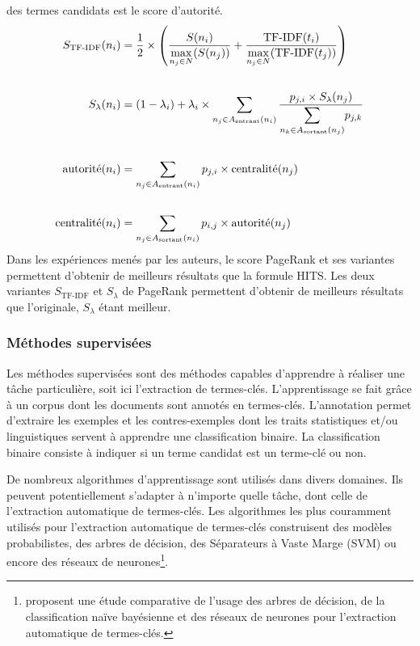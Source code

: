           des termes candidats est le score d'autorité.
          \begin{align}
            S_{\text{TF-IDF}}(n_i) &= \frac{1}{2} \times \left(\frac{S(n_i)}{\mathlarger{\max}_{n_j \in N}(S(n_j))} + \frac{\text{TF-IDF}(t_i)}{\mathlarger{\max}_{n_j \in N}(\text{TF-IDF}(t_j))}\right) \label{math:apw}\\
            \notag\\
            S_{\lambda}(n_i) &= (1 - \lambda_i) + \lambda_i \times \sum_{n_j \in A_{\text{entrant}}(n_i)} \frac{p_{j, i} \times S_{\lambda}(n_j)}{\mathlarger{\sum}_{n_k \in A_{\text{sortant}}(n_j)} p_{j, k}} \label{math:ppr}\\
            \notag\\
            \text{autorité}(n_i) &= \sum_{n_j \in A_{\text{entrant}}(n_i)}p_{j, i} \times \text{centralité}(n_j) \label{math:hitsauthority}\\
            \notag\\
            \text{centralité}(n_i) &= \sum_{n_j \in A_{\text{sortant}}(n_i)}p_{i, j} \times \text{autorité}(n_j) \label{math:hitshub}
          \end{align}
          Dans les expériences menés par les auteurs, le score PageRank et ses
          variantes permettent d'obtenir de meilleurs résultats que la formule HITS.
          Les deux variantes $S_{\text{TF-IDF}}$ et $S_{\lambda}$ de PageRank
          permettent d'obtenir de meilleurs résultats que l'originale,
          $S_{\lambda}$ étant meilleur.

      \subsubsection{Méthodes supervisées}
      \label{sec:supervised_methods}
        Les méthodes supervisées sont des méthodes capables d'apprendre à réaliser
        une tâche particulière, soit ici l'extraction de termes-clés.
        L'apprentissage se fait grâce à un corpus dont les documents sont annotés en
        termes-clés. L'annotation permet d'extraire les exemples et les
        contres-exemples dont les traits statistiques et/ou linguistiques servent à
        apprendre une classification binaire. La classification binaire consiste à
        indiquer si un terme candidat est un terme-clé ou non.

        De nombreux algorithmes d'apprentissage sont utilisés dans divers domaines.
        Ils peuvent potentiellement s'adapter à n'importe quelle tâche, dont celle
        de l'extraction automatique de termes-clés. Les algorithmes les plus
        couramment utilisés pour l'extraction automatique de termes-clés
        construisent des modèles probabilistes, des arbres de décision, des
        Séparateurs à Vaste Marge (SVM) ou encore des réseaux de
        neurones\footnote{\citet{sarkar2012machinelearningcomparison} proposent une
        étude comparative de l'usage des arbres de décision, de la classification
        naïve bayésienne et des réseaux de neurones pour l'extraction automatique de
        termes-clés.}.

